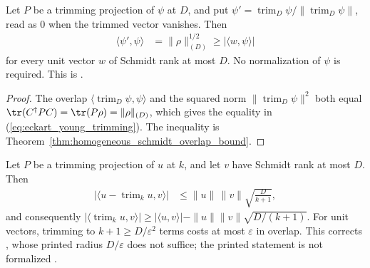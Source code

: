 \begin{theorem}
    \label{thm:eckart_young_trimming}
    \leanok
    Let $P$ be a trimming projection of $\psi$ at $D$, and put
    $\psi'=\operatorname{trim}_D\psi/\|\operatorname{trim}_D\psi\|$, read as
    $0$ when the trimmed vector vanishes. Then
    \begin{align}
        \langle\psi',\psi\rangle & =\|\rho\|_{(D)}^{1/2}\ge
        |\langle w,\psi\rangle|
        \label{eq:eckart_young_trimming}
    \end{align}
    for every unit vector $w$ of Schmidt rank at most $D$. No normalization
    of $\psi$ is required. This is \cite[Lemma~lem:eckart]{Landau2013PolynomialTime}.
\end{theorem}

\begin{proof}
    \leanok
    The overlap $\langle\operatorname{trim}_D\psi,\psi\rangle$ and the
    squared norm $\|\operatorname{trim}_D\psi\|^2$ both equal
    $\tr(C^\dagger PC)=\tr(P\rho)=\|\rho\|_{(D)}$, which gives the equality
    in (\ref{eq:eckart_young_trimming}). The inequality is
    Theorem~\ref{thm:homogeneous_schmidt_overlap_bound}.
\end{proof}

\begin{theorem}
    \label{thm:trimming_error_bounded_schmidt_rank}
    \leanok
    Let $P$ be a trimming projection of $u$ at $k$, and let $v$ have
    Schmidt rank at most $D$. Then
    \begin{align}
        \bigl|\langle u-\operatorname{trim}_k u,v\rangle\bigr|
         & \le\|u\|\,\|v\|\sqrt{\frac{D}{k+1}},
        \label{eq:trimming_error_bounded_schmidt_rank}
    \end{align}
    and consequently $|\langle\operatorname{trim}_k u,v\rangle|\ge
    |\langle u,v\rangle|-\|u\|\|v\|\sqrt{D/(k+1)}$. For unit vectors,
    trimming to $k+1\ge D/\varepsilon^2$ terms costs at most $\varepsilon$
    in overlap. This corrects
    \cite[Lemma~l:trim1]{Landau2013PolynomialTime}, whose printed radius
    $D/\varepsilon$ does not suffice; the printed statement is not
    formalized \cite{gap:lvv13_trimming_radius}.
\end{theorem}

